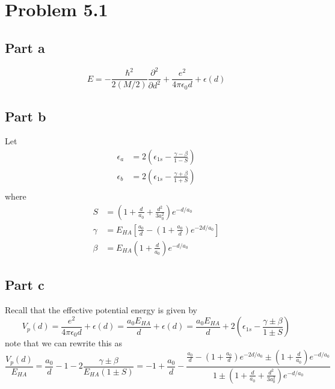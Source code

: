 \documentclass[12pt]{report}
\theoremstyle{custom}
\begin{document}
\maketitle

\section*{Problem 5.1}
\subsection*{Part a}

\begin{equation*}
 E = -\frac{\hbar^2}{2(M/2)} \frac{\partial^2}{\partial d^2} + \frac{e^2}{4\pi \epsilon_0 d} + \epsilon(d) 
\end{equation*}

\subsection*{Part b}
Let 
\begin{align*}
  \epsilon_a &= 2\left(\epsilon_{1s} - \frac{\gamma - \beta}{1 - S}\right) \\
  \epsilon_b &= 2\left(\epsilon_{1s} - \frac{\gamma + \beta}{1 + S} \right)\\
\end{align*}
where
\begin{align*}
  S &= \left(1 + \frac{d}{a_0} + \frac{d^2}{3a_0^2}\right)e^{-d/a_0} \\
  \gamma &= E_{HA} \left[\frac{a_0}{d} - \left(1 + \frac{a_0}{d}\right)e^{-2d/a_0}\right] \\
  \beta &= E_{HA} \left(1 + \frac{d}{a_0}\right)e^{-d/a_0}
\end{align*}
\subsection*{Part c}
Recall that the effective potential energy is given by
\begin{equation*}
V_p(d) = \frac{e^2}{4\pi \epsilon_0 d} + \epsilon(d) = \frac{a_0E_{HA}}{d} + \epsilon(d) = \frac{a_0E_{HA}}{d} + 2\left(\epsilon_{1s} - \frac{\gamma \pm \beta}{1 \pm S}\right)
\end{equation*}
note that we can rewrite this as
\begin{equation*}
\frac{V_p(d)}{E_{HA}} = \frac{a_0}{d} - 1 - 2\frac{\gamma \pm \beta}{E_{HA}(1 \pm S)} = -1 + \frac{a_0}{d} - \frac{\frac{a_0}{d} - \left(1 + \frac{a_0}{d}\right)e^{-2d/a_0}\pm \left(1 + \frac{d}{a_0}\right)e^{-d/a_0}}{1 \pm \left(1 + \frac{d}{a_0} + \frac{d^2}{3a_0^2}\right)e^{-d/a_0}}
\end{equation*}
\end{document}
